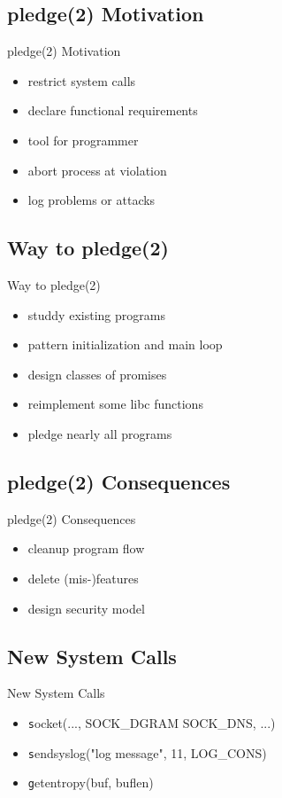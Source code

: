 \documentclass[14pt]{beamer}
\begin{document}
\subsection{pledge(2) Motivation}
\begin{frame}{pledge(2) Motivation}
\begin{itemize}
    \item restrict system calls
    \item declare functional requirements
    \item tool for programmer
    \item abort process at violation
    \item log problems or attacks
\end{itemize}
\end{frame}

\subsection{Way to pledge(2)}
\begin{frame}{Way to pledge(2)}
\begin{itemize}
    \item studdy existing programs
    \item pattern initialization and main loop
    \item design classes of promises
    \item reimplement some libc functions
    \item pledge nearly all programs
\end{itemize}
\end{frame}

\subsection{pledge(2) Consequences}
\begin{frame}{pledge(2) Consequences}
\begin{itemize}
    \item cleanup program flow
    \item delete (mis-)features
    \item design security model
\end{itemize}
\end{frame}

\subsection{New System Calls}
\begin{frame}{New System Calls}
\begin{itemize}
    \item {\texttt socket(..., SOCK\_DGRAM \textpipe{} SOCK\_DNS, ...) }
    \item {\texttt sendsyslog("log message", 11, LOG\_CONS) }
    \item {\texttt getentropy(buf, buflen) }
\end{itemize}
\end{frame}
\end{document}
